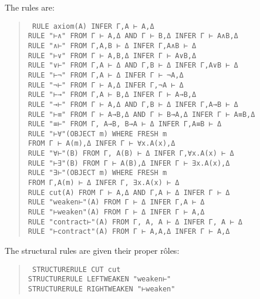 The rules are:
\begin{quote}\tt\small
RULE    axiom(A)                                        INFER Γ,A ⊢ A,Δ\\
RULE    "⊢∧"        FROM Γ ⊢ A,Δ AND Γ ⊢ B,Δ    INFER Γ ⊢ A∧B,Δ\\
RULE    "∧⊢"        FROM Γ,A,B ⊢ Δ                INFER Γ,A∧B ⊢ Δ\\
RULE    "⊢∨"        FROM Γ ⊢ A,B,Δ                 INFER Γ ⊢ A∨B,Δ\\
RULE    "∨⊢"        FROM Γ,A ⊢ Δ AND Γ,B ⊢ Δ    INFER Γ,A∨B ⊢ Δ\\
RULE    "⊢¬"        FROM Γ,A ⊢ Δ                   INFER Γ ⊢ ¬A,Δ\\
RULE    "¬⊢"        FROM Γ ⊢ A,Δ                   INFER Γ,¬A ⊢ Δ\\
RULE    "⊢→"        FROM Γ,A ⊢ B,Δ                 INFER Γ ⊢ A→B,Δ\\
RULE    "→⊢"        FROM Γ ⊢ A,Δ AND Γ,B ⊢ Δ    INFER Γ,A→B ⊢ Δ\\
RULE    "⊢≡"        FROM Γ ⊢ A→B,Δ AND Γ ⊢ B→A,Δ    INFER Γ ⊢ A≡B,Δ\\
RULE    "≡⊢"        FROM Γ, A→B, B→A ⊢ Δ         INFER Γ,A≡B ⊢ Δ\\
RULE    "⊢∀"(OBJECT m) WHERE FRESH m\\
\tab                     FROM Γ ⊢ A(m),Δ                INFER Γ ⊢ ∀x.A(x),Δ\\
RULE    "∀⊢"(B)     FROM Γ, A(B) ⊢ Δ               INFER Γ,∀x.A(x) ⊢ Δ\\
RULE    "⊢∃"(B)     FROM Γ ⊢ A(B),Δ                INFER Γ ⊢ ∃x.A(x),Δ\\
RULE    "∃⊢"(OBJECT m) WHERE FRESH m\\
\tab                     FROM  Γ,A(m) ⊢ Δ               INFER Γ, ∃x.A(x) ⊢ Δ\\
RULE    cut(A)  FROM Γ ⊢ A,Δ AND Γ,A ⊢ Δ          INFER Γ ⊢ Δ\\
RULE    "weaken⊢"(A)    FROM Γ ⊢ Δ                  INFER Γ,A ⊢ Δ\\
RULE    "⊢weaken"(A)    FROM Γ ⊢ Δ                  INFER Γ ⊢ A,Δ\\
RULE    "contract⊢"(A)  FROM Γ, A, A ⊢ Δ            INFER Γ, A ⊢ Δ\\
RULE    "⊢contract"(A)  FROM Γ ⊢ A,A,Δ              INFER Γ ⊢ A,Δ
\end{quote}

The structural rules are given their proper r\^{o}les:

\begin{quote}\tt\small
STRUCTURERULE CUT                   cut\\
STRUCTURERULE LEFTWEAKEN        "weaken⊢"\\
STRUCTURERULE RIGHTWEAKEN       "⊢weaken"
\end{quote}


